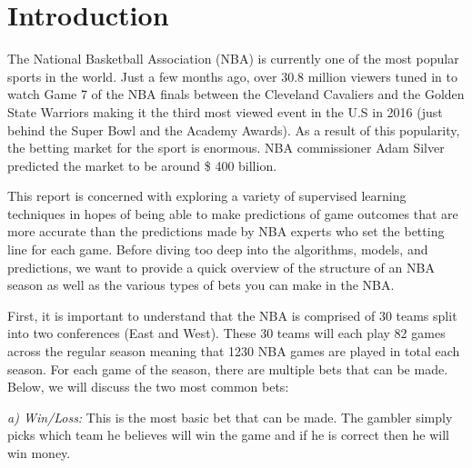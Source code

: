 \documentclass{article}
\begin{document}


\section{Introduction}
The National Basketball Association (NBA) is currently one of the most popular sports in the world. Just a few months ago, over 30.8 million viewers tuned in to watch Game 7 of the NBA finals between the Cleveland Cavaliers and the Golden State Warriors making it the third most viewed event in the U.S in 2016 (just behind the Super Bowl and the Academy Awards). As a result of this popularity, the betting market for the sport is enormous. NBA commissioner Adam Silver predicted the market to be around \$ 400 billion.

This report is concerned with exploring a variety of supervised learning techniques in hopes of being able to make predictions of game outcomes that are more accurate than the predictions made by NBA experts who set the betting line for each game. Before diving too deep into the algorithms, models, and predictions, we want to provide a quick overview of the structure of an NBA season as well as the various types of bets you can make in the NBA.

First, it is important to understand that the NBA is comprised of 30 teams split into two conferences (East and West). These 30 teams will each play 82 games across the regular season meaning that 1230 NBA games are played in total each season. For each game of the season, there are multiple bets that can be made. Below, we will discuss the two most common bets:

\textit{a) Win/Loss:} This is the most basic bet that can be made. The gambler simply picks which team he believes will win the game and if he is correct then he will win money.
\end{document}
